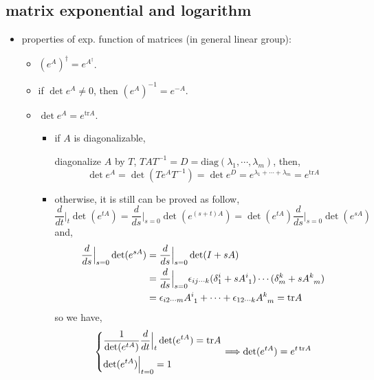 \subsection{matrix exponential and logarithm}
\begin{itemize}
	\item properties of exp. function of matrices (in general linear group):
	\begin{itemize}
		
		\item $(e^A)^\dag = e^{A^\dag}$.
		
		\item if $\det e^A \neq 0$, then $(e^A)^{-1} = e^{- A}$.
		
		\item $\det e^A = e^{\mathrm{tr} A}$.
		
		\begin{tcolorbox}[title=proof:]
			\begin{itemize}
				\item if $A$ is diagonalizable,
				
				diagonalize $A$ by $T$, $T A T^{- 1} = D = \mathrm{diag}(\lambda_1, \cdots, \lambda_m)$, then,
				\begin{equation}
					\det e^A = \det(T e^A T^{- 1}) = \det e^D = e^{\lambda_1 + \cdots + \lambda_m} = e^{\mathrm{tr} A}
				\end{equation}
				
				\item otherwise, it is still can be proved as follow,
				\begin{equation}
					\frac{d}{dt} \Big|_t \det(e^{t A}) = \frac{d}{ds} \Big|_{s = 0} \det(e^{(s + t) A}) = \det(e^{t A}) \frac{d}{ds} \Big|_{s = 0} \det(e^{s A})
				\end{equation}
				and,
				\begin{align}
					\frac{d}{ds} \Big|_{s = 0} \det(e^{s A}) &= \frac{d}{ds} \Big|_{s = 0} \det(I + s A) \notag \\
					&= \frac{d}{ds} \Big|_{s = 0} \epsilon_{i j \cdots k} (\delta^i_1 + s \tensor{A}{^i_1}) \cdots (\delta^k_m + s \tensor{A}{^k_m}) \notag \\
					&= \epsilon_{i 2 \cdots m} \tensor{A}{^i_1} + \cdots + \epsilon_{1 2 \cdots k} \tensor{A}{^k_m} = \mathrm{tr} A
				\end{align}
				so we have,
				\begin{equation}
					\begin{dcases}
						\frac{1}{\det(e^{t A})} \frac{d}{dt} \Big|_t \det(e^{t A}) = \mathrm{tr} A \\
						\det(e^{t A}) \Big|_{t = 0} = 1
					\end{dcases} \Longrightarrow \det(e^{t A}) = e^{t \, \mathrm{tr} A}
				\end{equation}
			\end{itemize}
		\end{tcolorbox}
		

\end{itemize}
\end{itemize}
